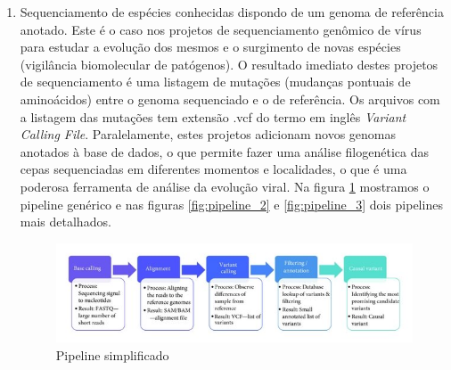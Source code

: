 \documentclass[12pt]{article}
\begin{document}
\begin{itemize}
\begin{enumerate}
              \item Sequenciamento de espécies conhecidas dispondo de um genoma de referência anotado. Este é o caso nos projetos de sequenciamento genômico de vírus para estudar a evolução dos mesmos e o surgimento de novas espécies (vigilância biomolecular de patógenos). O resultado imediato destes projetos de sequenciamento é uma listagem de mutações (mudanças pontuais de aminoácidos) entre o genoma sequenciado e o de referência. Os arquivos com a listagem das mutações tem extensão .vcf do termo em inglês {\it{Variant Calling File}}. Paralelamente, estes projetos adicionam novos genomas anotados à base de dados, o que permite fazer uma análise filogenética das cepas sequenciadas em diferentes momentos e localidades, o que é uma poderosa ferramenta de análise da evolução viral.
                    Na figura \ref{fig:pipeline_1} mostramos o pipeline genérico e nas figuras \ref{fig:pipeline_2} e \ref{fig:pipeline_3} dois pipelines mais detalhados.
                    \begin{figure}[h!]
                        \centering
                        \includegraphics[scale=2.3]{./figuras/Next-generation-sequencing-bioinformatics-workflow_W640}
                        \caption{Pipeline simplificado}
                        \label{fig:pipeline_1}
                    \end{figure}


\end{enumerate}
\end{itemize}
\end{document}
